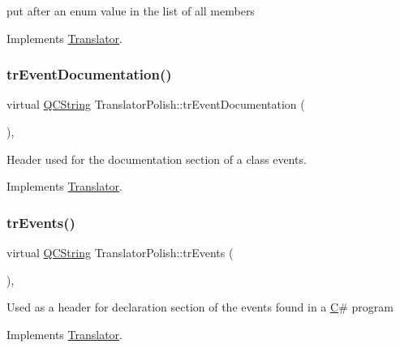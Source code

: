 put after an enum value in the list of all members 

Implements \mbox{\hyperlink{class_translator}{Translator}}.

\mbox{\label{class_translator_polish_a9a1e00b24df09230de3ca0ebb2cb7b1f}} 
\subsubsection{\texorpdfstring{trEventDocumentation()}{trEventDocumentation()}}
{\footnotesize\ttfamily virtual \mbox{\hyperlink{class_q_c_string}{Q\+C\+String}} Translator\+Polish\+::tr\+Event\+Documentation (\begin{DoxyParamCaption}{ }\end{DoxyParamCaption})\hspace{0.3cm}{\ttfamily [inline]}, {\ttfamily [virtual]}}

Header used for the documentation section of a class\textquotesingle{} events. 

Implements \mbox{\hyperlink{class_translator}{Translator}}.

\mbox{\label{class_translator_polish_ac399b9cdd43e225d284bddcd4f3bdabb}} 
\subsubsection{\texorpdfstring{trEvents()}{trEvents()}}
{\footnotesize\ttfamily virtual \mbox{\hyperlink{class_q_c_string}{Q\+C\+String}} Translator\+Polish\+::tr\+Events (\begin{DoxyParamCaption}{ }\end{DoxyParamCaption})\hspace{0.3cm}{\ttfamily [inline]}, {\ttfamily [virtual]}}

Used as a header for declaration section of the events found in a \mbox{\hyperlink{class_c}{C}}\# program 

Implements \mbox{\hyperlink{class_translator}{Translator}}.

\mbox{\label{class_translator_polish_adda882b0d8277983bbc5560fbc26aa78}} 

